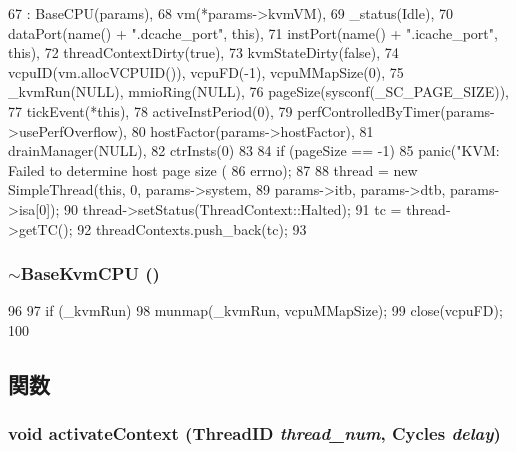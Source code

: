 \begin{DoxyCode}
67     : BaseCPU(params),
68       vm(*params->kvmVM),
69       _status(Idle),
70       dataPort(name() + ".dcache_port", this),
71       instPort(name() + ".icache_port", this),
72       threadContextDirty(true),
73       kvmStateDirty(false),
74       vcpuID(vm.allocVCPUID()), vcpuFD(-1), vcpuMMapSize(0),
75       _kvmRun(NULL), mmioRing(NULL),
76       pageSize(sysconf(_SC_PAGE_SIZE)),
77       tickEvent(*this),
78       activeInstPeriod(0),
79       perfControlledByTimer(params->usePerfOverflow),
80       hostFactor(params->hostFactor),
81       drainManager(NULL),
82       ctrInsts(0)
83 {
84     if (pageSize == -1)
85         panic("KVM: Failed to determine host page size (%
86               errno);
87 
88     thread = new SimpleThread(this, 0, params->system,
89                               params->itb, params->dtb, params->isa[0]);
90     thread->setStatus(ThreadContext::Halted);
91     tc = thread->getTC();
92     threadContexts.push_back(tc);
93 }
\end{DoxyCode}
\hypertarget{classBaseKvmCPU_abd186de5de7d9b8e90d2c1f08daf1ecd}{
\subsubsection[{$\sim$BaseKvmCPU}]{\setlength{\rightskip}{0pt plus 5cm}$\sim${\bf BaseKvmCPU} ()}}
\label{classBaseKvmCPU_abd186de5de7d9b8e90d2c1f08daf1ecd}



\begin{DoxyCode}
96 {
97     if (_kvmRun)
98         munmap(_kvmRun, vcpuMMapSize);
99     close(vcpuFD);
100 }
\end{DoxyCode}


\subsection{関数}
\hypertarget{classBaseKvmCPU_ad7a501b28bdbe8b3e708cd1ef69ac191}{
\subsubsection[{activateContext}]{\setlength{\rightskip}{0pt plus 5cm}void activateContext ({\bf ThreadID} {\em thread\_\-num}, \/  {\bf Cycles} {\em delay})}}
\label{classBaseKvmCPU_ad7a501b28bdbe8b3e708cd1ef69ac191}



